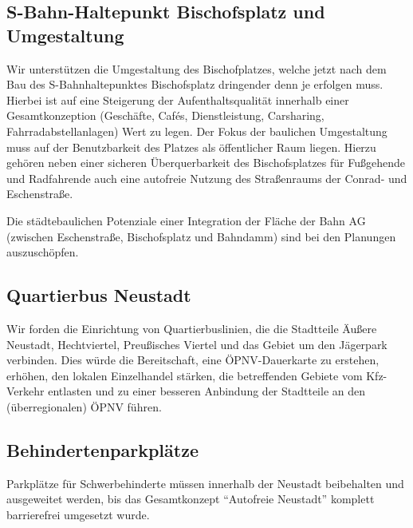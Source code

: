 \documentclass[a4paper, 11pt]{article}
\begin{document}
\subsection{S-Bahn-Haltepunkt Bischofsplatz und Umgestaltung}
Wir unterstützen die Umgestaltung des Bischofplatzes, welche jetzt nach dem Bau des S-Bahnhaltepunktes Bischofsplatz dringender denn je erfolgen muss. Hierbei ist auf eine Steigerung der Aufenthaltsqualität innerhalb einer Gesamtkonzeption (Geschäfte, Cafés, Dienstleistung, Carsharing, Fahrradabstellanlagen) Wert zu legen. Der Fokus der baulichen Umgestaltung muss auf der Benutzbarkeit des Platzes als öffentlicher Raum liegen. Hierzu gehören neben einer sicheren Überquerbarkeit des Bischofsplatzes für Fußgehende und Radfahrende auch eine autofreie Nutzung des Straßenraums der Conrad- und Eschenstraße.\newline

Die städtebaulichen Potenziale einer Integration der Fläche der Bahn AG (zwischen Eschenstraße, Bischofsplatz und Bahndamm) sind bei den Planungen auszuschöpfen.




\subsection{Quartierbus Neustadt}
Wir forden die Einrichtung von Quartierbuslinien, die die Stadtteile Äußere Neustadt, Hechtviertel, Preußisches Viertel und das Gebiet um den Jägerpark verbinden. Dies würde die Bereitschaft, eine ÖPNV-Dauerkarte zu erstehen, erhöhen, den lokalen Einzelhandel stärken, die betreffenden Gebiete vom Kfz-Verkehr entlasten und zu einer besseren Anbindung der Stadtteile an den (überregionalen) ÖPNV führen.


\subsection{Behindertenparkplätze}
Parkplätze für Schwerbehinderte müssen innerhalb der Neustadt beibehalten und ausgeweitet werden, bis das Gesamtkonzept ``Autofreie Neustadt'' komplett barrierefrei umgesetzt wurde.
\end{document}

